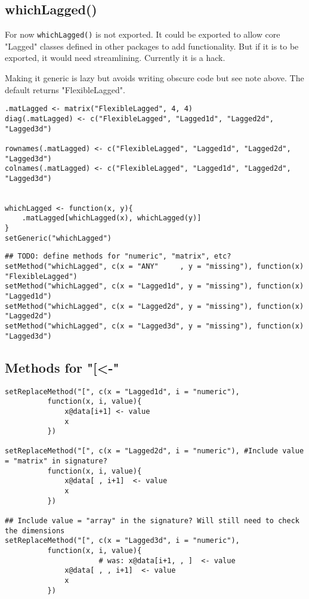 \documentclass[11pt,a4paper]{article}
\begin{document}
\subsection{whichLagged()}
\label{sec:orgf08c685}

For now \texttt{whichLagged()} is not exported. It could be exported to allow core "Lagged" classes
defined in other packages to add functionality. But if it is to be exported, it would need
streamlining. Currently it is a hack.

Making it generic is lazy but avoids writing obscure code but see note above.
The default returns "FlexibleLagged".
\begin{verbatim}
.matLagged <- matrix("FlexibleLagged", 4, 4)
diag(.matLagged) <- c("FlexibleLagged", "Lagged1d", "Lagged2d", "Lagged3d")

rownames(.matLagged) <- c("FlexibleLagged", "Lagged1d", "Lagged2d", "Lagged3d")
colnames(.matLagged) <- c("FlexibleLagged", "Lagged1d", "Lagged2d", "Lagged3d")


whichLagged <- function(x, y){
    .matLagged[whichLagged(x), whichLagged(y)]
}
setGeneric("whichLagged")
\end{verbatim}

\begin{verbatim}
## TODO: define methods for "numeric", "matrix", etc?
setMethod("whichLagged", c(x = "ANY"     , y = "missing"), function(x) "FlexibleLagged")
setMethod("whichLagged", c(x = "Lagged1d", y = "missing"), function(x) "Lagged1d")
setMethod("whichLagged", c(x = "Lagged2d", y = "missing"), function(x) "Lagged2d")
setMethod("whichLagged", c(x = "Lagged3d", y = "missing"), function(x) "Lagged3d")
\end{verbatim}


\subsection{Methods for "[<-"}
\label{sec:org1ebdd3d}

\begin{verbatim}
setReplaceMethod("[", c(x = "Lagged1d", i = "numeric"),
          function(x, i, value){
              x@data[i+1] <- value
              x
          })

setReplaceMethod("[", c(x = "Lagged2d", i = "numeric"), #Include value = "matrix" in signature?
          function(x, i, value){
              x@data[ , i+1]  <- value
              x
          })

## Include value = "array" in the signature? Will still need to check the dimensions
setReplaceMethod("[", c(x = "Lagged3d", i = "numeric"),
          function(x, i, value){
                      # was: x@data[i+1, , ]  <- value
              x@data[ , , i+1]  <- value
              x
          })
\end{verbatim}
\end{document}
